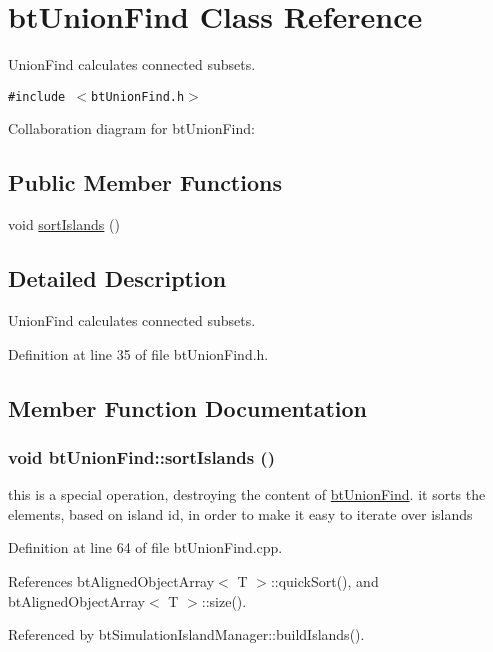 \hypertarget{classbt_union_find}{
\section{btUnionFind Class Reference}
\label{classbt_union_find}
}
UnionFind calculates connected subsets.  


{\tt \#include $<$btUnionFind.h$>$}

Collaboration diagram for btUnionFind:\subsection*{Public Member Functions}
\begin{CompactItemize}
\item 
void \hyperlink{classbt_union_find_8bf4647f84d20b033e0d0a7188f3b798}{sortIslands} ()
\end{CompactItemize}


\subsection{Detailed Description}
UnionFind calculates connected subsets. 

Definition at line 35 of file btUnionFind.h.

\subsection{Member Function Documentation}
\hypertarget{classbt_union_find_8bf4647f84d20b033e0d0a7188f3b798}{
\subsubsection[sortIslands]{\setlength{\rightskip}{0pt plus 5cm}void btUnionFind::sortIslands ()}}
\label{classbt_union_find_8bf4647f84d20b033e0d0a7188f3b798}


this is a special operation, destroying the content of \hyperlink{classbt_union_find}{btUnionFind}. it sorts the elements, based on island id, in order to make it easy to iterate over islands 

Definition at line 64 of file btUnionFind.cpp.

References btAlignedObjectArray$<$ T $>$::quickSort(), and btAlignedObjectArray$<$ T $>$::size().

Referenced by btSimulationIslandManager::buildIslands().

